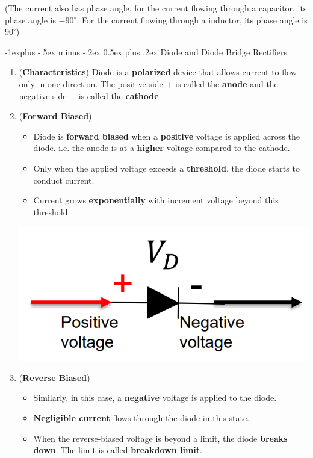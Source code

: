 \documentclass[10pt, landscape]{article}
\makeatletter
\renewcommand{\subsection}{\@startsection{subsection}{2}{0mm}%
                                {-1explus -.5ex minus -.2ex}%
                                {0.5ex plus .2ex}%
                                {\normalfont\normalsize\bfseries}}
\makeatother
\begin{document}
\begin{multicols}{4}
\begin{enumerate}
\begin{itemize}
        (The current also has phase angle, for the current flowing through a capacitor, its phase angle is $-90^\circ$. For the current flowing through a inductor, its phase angle is $90^\circ$)
    \end{itemize}
\end{enumerate}

\subsection{Diode and Diode Bridge Rectifiers}
\begin{enumerate}
    \item (\textbf{Characteristics}) Diode is a \textbf{polarized} device that allows current to flow only in one direction. The positive side $+$ is called the \textbf{anode} and the negative side $-$ is called the \textbf{cathode}.
    \item (\textbf{Forward Biased})
    \begin{itemize}
        \item Diode is \textbf{forward biased} when a \textbf{positive} voltage is applied across the diode. i.e. the anode is at a \textbf{higher} voltage compared to the cathode.
        \item Only when the applied voltage exceeds a \textbf{threshold}, the diode starts to conduct current.
        \item Current grows \textbf{exponentially} with increment voltage beyond this threshold.
    \end{itemize}
    \centerline{\includegraphics[width=0.5\linewidth]{images/forward-biased-diode.png}}
    \item (\textbf{Reverse Biased})
    \begin{itemize}
        \item Similarly, in this case, a \textbf{negative} voltage is applied to the diode.
        \item \textbf{Negligible current} flows through the diode in this state.
        \item When the reverse-biased voltage is beyond a limit, the diode \textbf{breaks down}. The limit is called \textbf{breakdown limit}.
    \end{itemize}

\end{enumerate}
\end{multicols}
\end{document}
